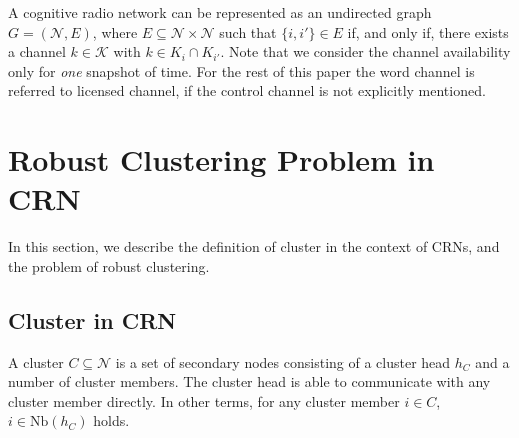 \documentclass[10pt,journal,compsoc]{IEEEtran}
\theoremstyle{mytheoremstyle}
\theoremstyle{mytheoremstyle}
\theoremstyle{mytheoremstyle}
\newcommand{\ie}{i.e., }
\begin{document}
A cognitive radio network can be represented as an undirected graph $G = (\mathcal{N}, E)$, where $E \subseteq \mathcal{N} \times \mathcal{N}$ such that $\{i, i'\} \in E$  if, and only if, there exists a channel $k \in \mathcal{K}$ with $k \in K_{i} \cap K_{i'}$. Note that we consider the channel availability only for \textit{one} snapshot of time. For the rest of this paper the word channel is referred to licensed channel, if the control channel is not explicitly mentioned.


\section{Robust Clustering Problem in CRN}
\label{problem}
In this section, we describe the definition of cluster in the context of CRNs, and the problem of robust clustering.

\subsection{Cluster in CRN}
\label{def_cluster}
A cluster $C \subseteq \mathcal{N}$ is a set of secondary nodes consisting of a cluster head $h_C$ and a number of cluster members.
The cluster head is able to communicate with any cluster member directly.
In other terms, for any cluster member $i \in C$, $i \in \text{Nb} (h_C) $ holds.

\end{document}
